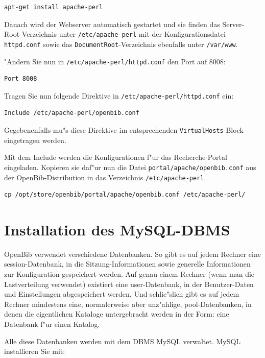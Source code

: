 \documentclass[11pt, twoside, a4paper, BCOR8mm, DIV12, bibtotoc,idxtotoc]{scrbook}
\begin{document}
\begin{verbatim}
apt-get install apache-perl
\end{verbatim}

Danach wird der Webserver automatisch gestartet und sie finden das
Server-Root-Verzeichnis unter \texttt{/etc/apache-perl} mit der
Konfigurationsdatei \texttt{httpd.conf} sowie das
\texttt{DocumentRoot}-Verzeichnis ebenfalls unter \texttt{/var/www}.

"Andern Sie nun in \texttt{/etc/apache-perl/httpd.conf} den Port auf
8008:

\begin{verbatim}
Port 8008
\end{verbatim}

Tragen Sie nun folgende Direktive in \texttt{/etc/apache-perl/httpd.conf} ein:

\begin{verbatim}
Include /etc/apache-perl/openbib.conf
\end{verbatim}

Gegebenenfalls mu"s diese Direktive im entsprechenden
\texttt{VirtualHosts}-Block eingetragen werden.

Mit dem Include werden die Konfigurationen f"ur das Recherche-Portal
eingeladen. Kopieren sie daf"ur nun die Datei
\texttt{portal/apache/openbib.conf} aus der OpenBib-Distribution in
das Verzeichnis \texttt{/etc/apache-perl}.

\begin{verbatim}
cp /opt/store/openbib/portal/apache/openbib.conf /etc/apache-perl/
\end{verbatim}


\section{Installation des MySQL-DBMS}
\label{sec:instmysql}

OpenBib verwendet verschiedene Datenbanken. So gibt es auf jedem
Rechner eine session-Datenbank, in die Sitzung-Informationen sowie
generelle Informationen zur Konfiguration gespeichert werden. Auf
genau einem Rechner (wenn man die Lastverteilung verwendet) existiert
eine user-Datenbank, in der Benutzer-Daten und Einstellungen
abgespeichert werden. Und schlie"slich gibt es auf jedem Rechner
mindestens eine, normalerweise aber unz"ahlige, pool-Datenbanken, in
denen die eigentlichen Kataloge untergebracht werden in der Form: eine
Datenbank f"ur einen Katalog.

Alle diese Datenbanken werden mit dem DBMS MySQL verwaltet. MySQL
installieren Sie mit:
\end{document}
